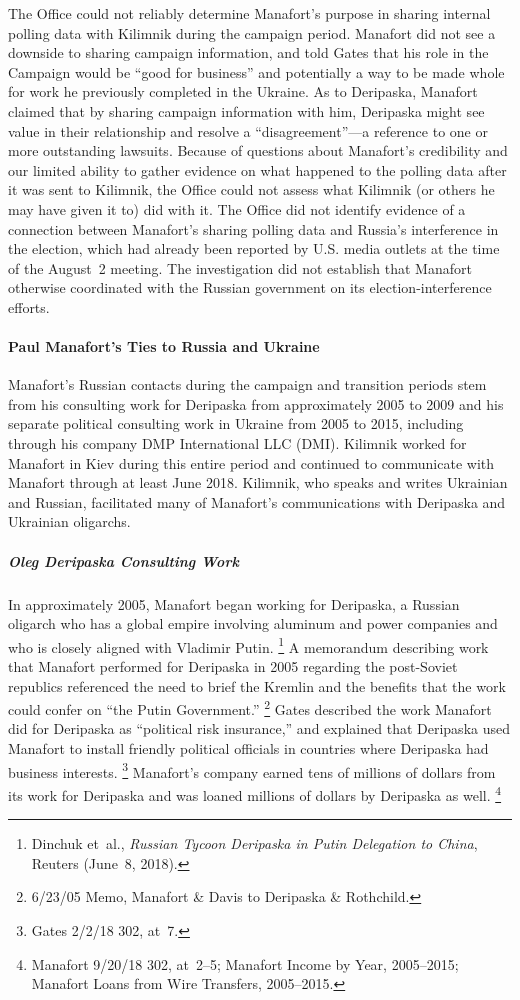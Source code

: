 The Office could not reliably determine Manafort's purpose in sharing internal polling data with Kilimnik during the campaign period.
Manafort
did not see a downside to sharing campaign information, and told Gates that his role in the Campaign would be ``good for business'' and potentially a way to be made whole for work he previously completed in the Ukraine.
As to Deripaska, Manafort claimed that by sharing campaign information with him, Deripaska might see value in their relationship and resolve a ``disagreement''---a reference to one or more outstanding lawsuits.
Because of questions about Manafort's credibility and our limited ability to gather evidence on what happened to the polling data after it was sent to Kilimnik, the Office could not assess what Kilimnik (or others he may have given it to) did with it.
The Office did not identify evidence of a connection between Manafort's sharing polling data and Russia's interference in the election, which had already been reported by U.S. media outlets at the time of the August~2 meeting.
The investigation did not establish that Manafort otherwise coordinated with the Russian government on its election-interference efforts.

\paragraph{Paul Manafort's Ties to Russia and Ukraine}

Manafort's Russian contacts during the campaign and transition periods stem from his consulting work for Deripaska from approximately 2005 to 2009 and his separate political consulting work in Ukraine from 2005 to 2015, including through his company DMP International LLC (DMI).
Kilimnik worked for Manafort in Kiev during this entire period and continued to communicate with Manafort through at least June 2018.
Kilimnik, who speaks and writes Ukrainian and Russian, facilitated many of Manafort's communications with Deripaska and Ukrainian oligarchs.

\subparagraph{Oleg Deripaska Consulting Work}

In approximately 2005, Manafort began working for Deripaska, a Russian oligarch who has a global empire involving aluminum and power companies and who is closely aligned with Vladimir Putin.%
\footnote{Dinchuk et~al., \textit{Russian Tycoon Deripaska in Putin Delegation to China}, Reuters (June~8, 2018).}
A memorandum describing work that Manafort performed for Deripaska in 2005 regarding the post-Soviet republics referenced the need to brief the Kremlin and the benefits that the work could confer on ``the Putin Government.''%
\footnote{6/23/05 Memo, Manafort \& Davis to Deripaska \& Rothchild.}
Gates described the work Manafort did for Deripaska as ``political risk insurance,'' and explained that Deripaska used Manafort to install friendly political officials in countries where Deripaska had business interests.%
\footnote{Gates 2/2/18 302, at~7.}
Manafort's company earned tens of millions of dollars from its work for Deripaska and was loaned millions of dollars by Deripaska as well.%
\footnote{Manafort 9/20/18 302, at~2--5;
Manafort Income by Year, 2005--2015;
Manafort Loans from Wire Transfers, 2005--2015.}

